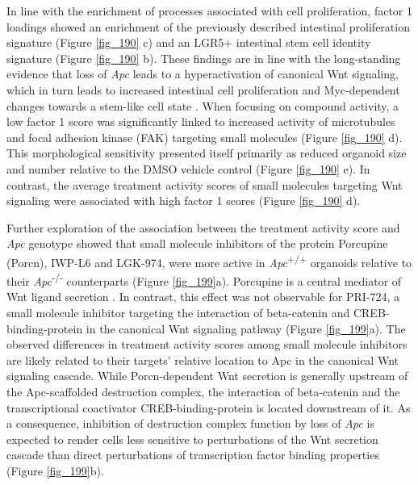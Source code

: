 \begin{flushleft}
In line with the enrichment of processes associated with cell proliferation, factor 1 loadings showed an enrichment of the previously described intestinal proliferation signature (Figure \ref{fig_190} c) and an LGR5+ intestinal stem cell identity signature (Figure \ref{fig_190} b). These findings are in line with the long-standing evidence that loss of \textit{Apc} leads to a hyperactivation of canonical Wnt signaling, which in turn leads to increased intestinal cell proliferation and Myc-dependent changes towards a stem-like cell state \parencite{sansomMycDeletionRescues2007, satohGlobalMetabolicReprogramming2017}. When focusing on compound activity, a low factor 1 score was significantly linked to increased activity of microtubules and focal adhesion kinase (FAK) targeting small molecules (Figure \ref{fig_190} d). This morphological sensitivity presented itself primarily as reduced organoid size and number relative to the DMSO vehicle control (Figure \ref{fig_190} e). In contrast, the average treatment activity scores of small molecules targeting Wnt signaling were associated with high factor 1 scores (Figure \ref{fig_190} d).  
\bigbreak

Further exploration of the association between the treatment activity score and \textit{Apc} genotype showed that small molecule inhibitors of the protein Porcupine (Porcn), IWP-L6 and LGK-974, were more active in \textit{Apc}\textsuperscript{+/+} organoids relative to their \textit{Apc}\textsuperscript{-/-}  counterparts (Figure \ref{fig_199}a). Porcupine is a central mediator of Wnt ligand secretion \parencite{liuTargetingWntdrivenCancer2013}. In contrast, this effect was not observable for PRI-724, a small molecule inhibitor targeting the interaction of beta-catenin and CREB-binding-protein in the canonical Wnt signaling pathway \parencite{okazakiNovelInhibitorPRI7242019} (Figure \ref{fig_199}a). The observed differences in treatment activity scores among small molecule inhibitors are likely related to their targets' relative location to Apc in the canonical Wnt signaling cascade. While Porcn-dependent Wnt secretion is generally upstream of the Apc-scaffolded destruction complex, the interaction of beta-catenin and the transcriptional coactivator CREB-binding-protein is located downstream of it. As a consequence, inhibition of destruction complex function by loss of \textit{Apc} is expected to render cells less sensitive to perturbations of the Wnt secretion cascade than direct perturbations of transcription factor binding properties (Figure \ref{fig_199}b).


\end{flushleft}
